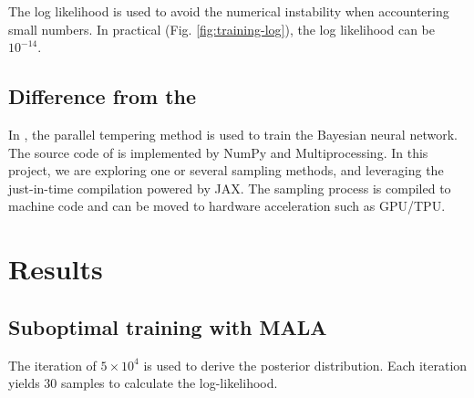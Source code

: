 \documentclass{article}
\begin{document}
The log likelihood is used to avoid the numerical instability when accountering small numbers. In practical (Fig. \ref{fig:training-log}), the log likelihood can be $10^{-14}$. 

\subsection{Difference from the \cite{chandra2021bayesian}}

In \cite{chandra2021bayesian}, the parallel tempering method is used to train the Bayesian neural network. The source code of \cite{chandra2019langevin} is implemented by NumPy and Multiprocessing. In this project, we are exploring one or several sampling methods, and leveraging the just-in-time compilation powered by JAX\cite{jax2018github}. The sampling process is compiled to machine code and can be moved to hardware acceleration such as GPU/TPU.


\section{Results}

\subsection{Suboptimal training with MALA}

The iteration of $5\times 10^4$ is used to derive the posterior distribution. Each iteration yields $30$ samples to calculate the log-likelihood. 
\end{document}
